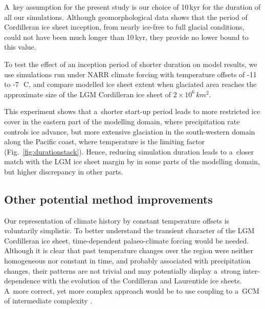\documentclass[tc, ms]{copernicus}
\begin{document}
A~key assumption for the present study is our choice of 10\,kyr for the duration of all our simulations. Although geomorphological data shows that the period of Cordilleran ice sheet inception, from nearly ice-free to full glacial conditions, could not have been much longer than 10\,kyr, they provide no lower bound to this value.

To test the effect of an inception period of shorter duration on model results, we use simulations run under NARR climate forcing with temperature offsets of -11 to -7\,\unit{{\degree}C}, and compare modelled ice sheet extent when glaciated area reaches the approximate size of the LGM Cordilleran ice sheet of $2\times 10^6\,\unit{km^2}$.

This experiment shows that a~shorter start-up period leads to more restricted ice cover in the eastern part of the modelling domain, where precipitation rate controls ice advance, but more extensive glaciation in the south-western domain along the Pacific coast, where temperature is the limiting factor (Fig.~\ref{fig:durationstack}). Hence, reducing simulation duration leads to a~closer match with the LGM ice sheet margin by \citet{dyke-2004} in some parts of the modelling domain, but higher discrepancy in other parts.

\subsection{Other potential method improvements}

Our representation of climate history by constant temperature offsets is voluntarily simplistic. To better understand the transient character of the LGM Cordilleran ice sheet, time-dependent palaeo-climate forcing would be needed. Although it is clear that past temperature changes over the region were neither homogeneous nor constant in time, and probably associated with precipitation changes, their patterns are not trivial and may potentially display a~strong inter-dependence with the evolution of the Cordilleran and Laurentide ice sheets. A~more correct, yet more complex approach would be to use coupling to a~GCM of intermediate complexity \citep{yoshimori-etal-2001,calov-etal-2002,abeouchi-etal-2007,charbit-etal-2013}.
\end{document}
